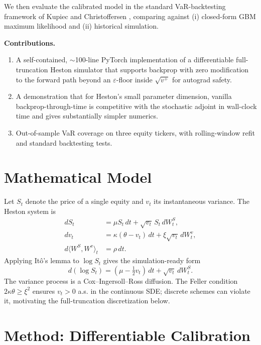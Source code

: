 \documentclass[11pt]{article}
\begin{document}
We then evaluate the calibrated model in the standard VaR-backtesting
framework of Kupiec \cite{kupiec1995} and Christoffersen
\cite{christoffersen1998}, comparing against (i) closed-form GBM maximum
likelihood and (ii) historical simulation.

\textbf{Contributions.}
\begin{enumerate}
\item A self-contained, $\sim$100-line PyTorch implementation of a
  differentiable full-truncation Heston simulator that supports backprop with
  zero modification to the forward path beyond an $\varepsilon$-floor inside
  $\sqrt{v^+}$ for autograd safety.
\item A demonstration that for Heston's small parameter dimension, vanilla
  backprop-through-time is competitive with the stochastic adjoint
  \cite{li2020adjointsde} in wall-clock time and gives substantially simpler
  numerics.
\item Out-of-sample VaR coverage on three equity tickers, with rolling-window
  refit and standard backtesting tests.
\end{enumerate}

\section{Mathematical Model}
\label{sec:model}

Let $S_t$ denote the price of a single equity and $v_t$ its instantaneous
variance. The Heston system is
\begin{align}
  dS_t &= \mu S_t\, dt + \sqrt{v_t}\, S_t\, dW_t^S, \label{eq:heston-S}\\
  dv_t &= \kappa(\theta - v_t)\, dt + \xi \sqrt{v_t}\, dW_t^v, \label{eq:heston-v}\\
  d\langle W^S, W^v\rangle_t &= \rho\, dt. \label{eq:heston-rho}
\end{align}
Applying It\^o's lemma to $\log S_t$ gives the simulation-ready form
\begin{equation}
  d(\log S_t) = (\mu - \tfrac{1}{2} v_t)\, dt + \sqrt{v_t}\, dW_t^S.
  \label{eq:heston-logS}
\end{equation}
The variance process is a Cox--Ingersoll--Ross diffusion. The Feller
condition $2\kappa\theta \ge \xi^2$ ensures $v_t > 0$ a.s. in the continuous
SDE; discrete schemes can violate it, motivating the full-truncation
discretization below.

\section{Method: Differentiable Calibration}
\label{sec:method}
\end{document}
